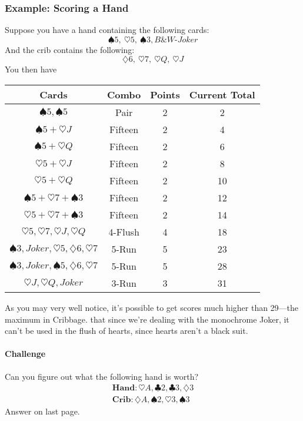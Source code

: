 \documentclass{article}
\begin{document}
\subsubsection{Example: Scoring a Hand}
Suppose you have a hand containing the following cards:
\[ \spadesuit 5,\ \heartsuit 5,\ \spadesuit 3, \textit{B\&W-Joker} \]
And the crib contains the following:
\[ \diamondsuit 6,\ \heartsuit 7,\ \heartsuit Q,\ \heartsuit J\]
You then have
\begin{center}
\begin{tabular}{c|c|c|c}
    Cards & Combo & Points & Current Total\\\hline
    $\spadesuit 5, \spadesuit 5$ & Pair & 2 & 2\\
    $\spadesuit 5 + \heartsuit J$ & Fifteen & 2 & 4 \\
    $\spadesuit 5 + \heartsuit Q$ & Fifteen & 2 & 6 \\
    $\heartsuit 5 + \heartsuit J$ & Fifteen & 2 & 8 \\
    $\heartsuit 5 + \heartsuit Q$ & Fifteen & 2 & 10 \\
    $\spadesuit 5 + \heartsuit 7 + \spadesuit 3$ & Fifteen & 2 & 12\\
    $\heartsuit 5 + \heartsuit 7 + \spadesuit 3$ & Fifteen & 2 & 14\\
    $\heartsuit 5, \heartsuit 7, \heartsuit J, \heartsuit Q$ & 4-Flush & 4 & 18\\
    $\spadesuit 3, Joker, \heartsuit 5, \diamondsuit 6, \heartsuit 7$ & 5-Run & 5 & 23\\
    $\spadesuit 3, Joker, \spadesuit 5, \diamondsuit 6, \heartsuit 7$ & 5-Run & 5 & 28\\
    $\heartsuit J, \heartsuit Q, Joker$ & 3-Run & 3 & 31\\ 
\end{tabular}
\end{center}
As you may very well notice, it's possible to get scores much higher than 29---the maximum in Cribbage.
\note that since we're dealing with the monochrome Joker, it can't be used in the flush of hearts, since hearts aren't a black suit.

\paragraph{Challenge} Can you figure out what the following hand is worth?
\begin{align*}
\mathbf{Hand}: \heartsuit A, \clubsuit 2, \clubsuit 3, \diamondsuit 3\\
\mathbf{Crib}: \diamondsuit A, \spadesuit 2, \heartsuit 3, \spadesuit 3
\end{align*}
Answer on last page.
\end{document}
